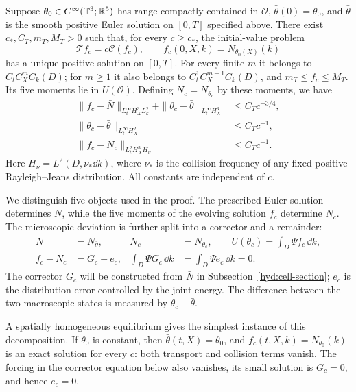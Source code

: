 \begin{theorem}\label{hyd:main}
 Suppose $\theta_0\in C^\infty(\mathbb T^3;\mathbb R^5)$ has range compactly contained
 in $\mathcal O$, $\bar\theta(0)=\theta_0$, and $\bar\theta$ is the smooth
 positive Euler solution on $[0,T]$ specified above. There exist
 $c_*,C_T,m_T,M_T>0$ such that, for every $c\ge c_*$, the initial-value
 problem
 \begin{equation}\label{hyd:kinetic}
 \mathcal T f_c=c\mathcal C(f_c),\qquad f_c(0,X,k)=N_{\theta_0(X)}(k)
 \end{equation}
 has a unique positive solution on $[0,T]$. For every finite $m$ it
 belongs to $C_tC_X^mC_k(D)$; for $m\ge1$ it also belongs to
 $C_t^1C_X^{m-1}C_k(D)$, and $m_T\le f_c\le M_T$.
 Its five moments lie in $U(\mathcal O)$. Defining
 $N_c=N_{\theta_c}$ by these moments, we have
 \begin{align}
 \|f_c-\bar N\|_{L^\infty_tH_X^3L_k^2}
       +\|\theta_c-\bar\theta\|_{L^\infty_tH_X^3}
      &\le C_Tc^{-3/4},\label{hyd:main-H3}\\
 \|\theta_c-\bar\theta\|_{L^\infty_tH_X^2}
      &\le C_Tc^{-1},\label{hyd:main-H2}\\
 \|f_c-N_c\|_{L^2_tH_X^3H_\nu}&\le C_Tc^{-1}.
 \label{hyd:main-weighted}
 \end{align}
 Here $H_\nu=L^2(D,\nu_*\dd k)$, where $\nu_*$ is the collision
 frequency of any fixed positive Rayleigh--Jeans distribution.
 All constants are independent of $c$.
\end{theorem}

We distinguish five objects used in the proof. The prescribed Euler
solution determines $\bar N$, while the five moments of the evolving
solution $f_c$ determine $N_c$. The microscopic deviation is further
split into a corrector and a remainder:
\[
 \begin{aligned}
 \bar N&=N_{\bar\theta},
       &N_c&=N_{\theta_c},\qquad
          U(\theta_c)=\int_D\Psi f_c\,\dd k,\\
 f_c-N_c&=G_c+e_c,
       &\int_D\Psi G_c\,\dd k
          &=\int_D\Psi e_c\,\dd k=0.
 \end{aligned}
\]
The corrector $G_c$ will be constructed from $\bar N$ in
Subsection~\ref{hyd:cell-section}; $e_c$ is the distribution error
controlled by the joint energy. The difference between the two
macroscopic states is measured by $\theta_c-\bar\theta$.

A spatially homogeneous equilibrium gives the simplest instance of this
decomposition. If $\theta_0$ is constant, then
$\bar\theta(t,X)=\theta_0$, and $f_c(t,X,k)=N_{\theta_0}(k)$ is an exact
solution for every $c$: both transport and collision terms vanish.
The forcing in the corrector equation below also vanishes, its small
solution is $G_c=0$, and hence $e_c=0$.

